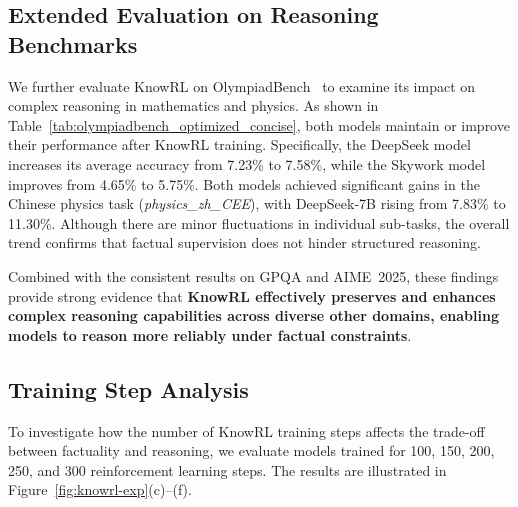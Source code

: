 


\subsection{Extended Evaluation on Reasoning Benchmarks}
We further evaluate KnowRL on OlympiadBench~\citep{he2024olympiadbench} to examine its impact on complex reasoning in mathematics and physics. 
As shown in Table~\ref{tab:olympiadbench_optimized_concise}, both models maintain or improve their performance after KnowRL training. 
Specifically, the DeepSeek model increases its average accuracy from 7.23\% to 7.58\%, while the Skywork model improves from 4.65\% to 5.75\%. 
Both models achieved significant gains in the Chinese physics task (\textit{physics\_zh\_CEE}), with DeepSeek-7B rising from 7.83\% to 11.30\%. 
Although there are minor fluctuations in individual sub-tasks, the overall trend confirms that factual supervision does not hinder structured reasoning.


Combined with the consistent results on GPQA and AIME~2025, these findings provide strong evidence that \textbf{KnowRL effectively preserves and enhances complex reasoning capabilities across diverse other domains, enabling models to reason more reliably under factual constraints}.





\subsection{Training Step Analysis}
To investigate how the number of KnowRL training steps affects the trade-off between factuality and reasoning, we evaluate models trained for 100, 150, 200, 250, and 300 reinforcement learning steps. 
The results are illustrated in Figure~\ref{fig:knowrl-exp}(c)--(f).

